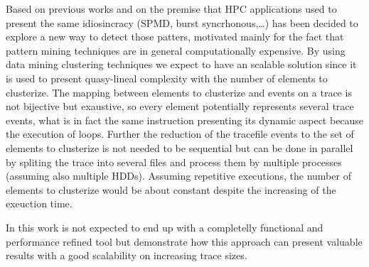 Based on previous works and on the premise that HPC applications used to present
the same idiosincracy (SPMD, burst syncrhonous,\ldots) has been decided to
explore a new way to detect those patters, motivated mainly for the fact that
pattern mining techniques are in general computationally expensive. By using data 
mining clustering techniques we expect to have an scalable
solution since it is used to present quasy-lineal complexity with the number of 
elements to clusterize. The mapping between elements to clusterize and events on
a trace is not bijective but exaustive, so every element potentially represents 
several trace events, what is in fact the same instruction presenting its dynamic
aspect because the execution of loops. Further the reduction of the tracefile
events to the set of elements to clusterize is not needed to be sequential but 
can be done in parallel by spliting the trace into several files and process
them by multiple processes (assuming also multiple HDDs). Assuming repetitive 
executions, the number of elements to clusterize would be about constant despite 
the increasing of the exeuction time.

In this work is not expected to end up with a completelly functional and
performance refined tool but demonstrate how this approach can present valuable 
results with a good scalability on increasing trace sizes.
